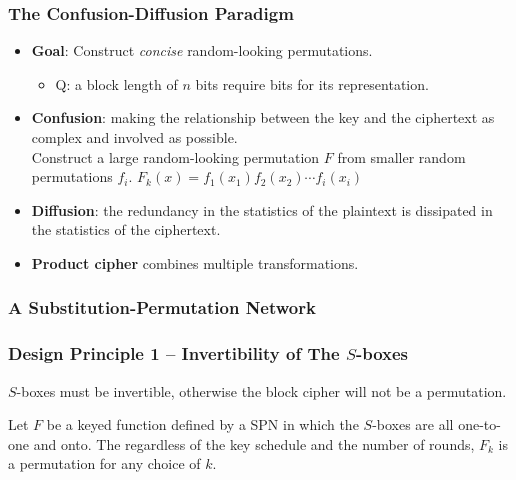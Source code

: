 \begin{frame}\frametitle{The Confusion-Diffusion Paradigm}
	\begin{itemize}
	\item \textbf{Goal}: Construct \emph{concise} random-looking permutations.
	\begin{itemize}
	\item \alert{Q: a block length of $n$ bits require \underline{\qquad} bits for its representation.} %
	\end{itemize}
	\item \textbf{Confusion}: making the relationship between the key and the ciphertext as complex and involved as possible. \\
	Construct a large random-looking permutation $F$ from smaller random permutations ${f_i}$. $F_k(x) = f_1(x_1)f_2(x_2) \cdots f_{i}(x_{i})$
	\item \textbf{Diffusion}: the redundancy in the statistics of the plaintext is dissipated in the statistics of the ciphertext.
	\item \textbf{Product cipher} combines multiple transformations.
	\end{itemize}
\end{frame}
\begin{frame}\frametitle{A Substitution-Permutation Network}
\begin{figure}
\begin{center}

\end{center}
\end{figure}
\end{frame}
\begin{frame}\frametitle{Design Principle 1 -- Invertibility of The $S$-boxes}
$S$-boxes must be invertible, otherwise the block cipher will not be a permutation.
\begin{proposition}
Let $F$ be a keyed function defined by a SPN in which the $S$-boxes are all one-to-one and onto. The regardless of the key schedule and the number of rounds, $F_k$ is a permutation for any choice of $k$.
\end{proposition}
\end{frame}
